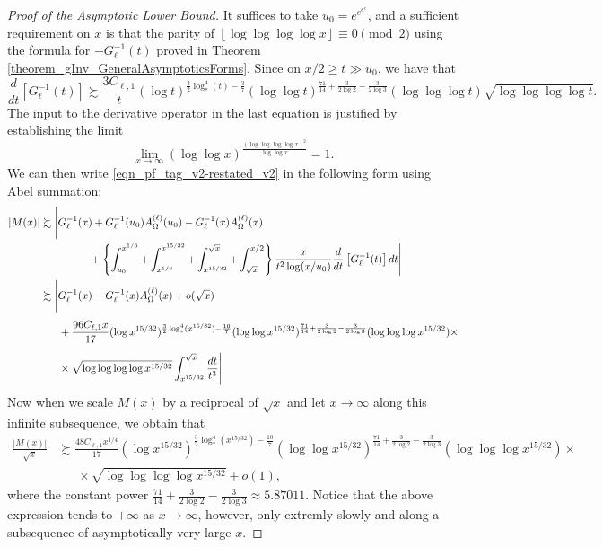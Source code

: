 \documentclass[11pt,reqno,a4letter]{article}
\numberwithin{figure}{section}
\numberwithin{table}{section}
\newcommand{\floor}[1]{\left\lfloor #1 \right\rfloor}
\theoremstyle{plain}
\numberwithin{theorem}{section}
\theoremstyle{definition}
\begin{document}
\begin{proof}[Proof of the Asymptotic Lower Bound] 
It suffices to take $u_0 = e^{e^{e^{e}}}$, 
and a sufficient requirement on $x$ is that the parity of 
$\floor{\log\log\log\log x} \equiv 0 \pmod{2}$ using the formula for 
$-G_{\ell}^{-1}(t)$ proved in Theorem \ref{theorem_gInv_GeneralAsymptoticsForms}. 
Since on $x/2 \geq t \gg u_0$, we have that 
\[
\frac{d}{dt}\left[G_{\ell}^{-1}(t)\right] \succsim 
     \frac{3 C_{\ell,1}}{t} (\log t)^{\frac{3}{2} \log_{\ast}^4(t) - \frac{3}{7}} 
     (\log\log t)^{\frac{71}{14} + \frac{3}{2 \log 2} - \frac{3}{2 \log 3}} 
     (\log\log\log t) \sqrt{\log\log\log\log t}. 
\]
The input to the derivative operator in the last equation is justified by establishing the limit 
\[
\lim_{x \rightarrow \infty} (\log\log x)^{\frac{(\log\log\log\log x)^2}{\log\log x}} = 1. 
\]
We can then write \eqref{eqn_pf_tag_v2-restated_v2} in the following form using Abel summation: 
\begin{align} 
\label{eqn_pf_tag_v2-restated_v3} 
|M(x)| & \succsim \Biggl\lvert G_{\ell}^{-1}(x) + G_{\ell}^{-1}(u_0) A_{\Omega}^{(\ell)}(u_0) - 
      G_{\ell}^{-1}(x) A_{\Omega}^{(\ell)}(x) \\ 
\notag 
      & \phantom{\succsim G_{ell}^{-1}(x)\ } + 
      \left\{\int_{u_0}^{x^{1/6}} + \int_{x^{1/6}}^{x^{15/32}} + \int_{x^{15/32}}^{\sqrt{x}} + 
      \int_{\sqrt{x}}^{x/2}\right\} 
      \frac{x}{t^2 \log(x/u_0)} \frac{d}{dt}\left[G_{\ell}^{-1}(t)\right] dt 
      \Biggr\rvert \\ 
\notag 
      & \succsim \Biggl\lvert G_{\ell}^{-1}(x) - 
      G_{\ell}^{-1}(x) A_{\Omega}^{(\ell)}(x) + o(\sqrt{x}) \\ 
\notag 
      & \phantom{\succsim \Biggl\lvert\ } + 
      \frac{96 C_{\ell,1} x}{17} (\log x^{15/32})^{\frac{3}{2} 
      \log_{\ast}^4(x^{15/32}) - \frac{10}{7}} 
      (\log\log x^{15/32})^{\frac{71}{14} + \frac{3}{2 \log 2} - \frac{3}{2 \log 3}} 
      (\log\log\log x^{15/32}) \times \\ 
\notag 
      & \phantom{\succsim \Biggl\lvert\ } \times 
      \sqrt{\log\log\log\log x^{15/32}} 
      \int_{x^{15/32}}^{\sqrt{x}} \frac{dt}{t^3}  
      \Biggr\rvert 
\end{align} 
Now when we scale $M(x)$ by a reciprocal of $\sqrt{x}$ and let 
$x \rightarrow \infty$ along this infinite subsequence, we obtain that 
\begin{align*} 
\frac{|M(x)|}{\sqrt{x}} & \succsim 
     \frac{48 C_{\ell,1} x^{1/4}}{17} (\log x^{15/32})^{\frac{3}{2} 
      \log_{\ast}^4(x^{15/32}) - \frac{10}{7}} 
      (\log\log x^{15/32})^{\frac{71}{14} + \frac{3}{2 \log 2} - \frac{3}{2 \log 3}} 
      (\log\log\log x^{15/32}) \times \\ 
      & \phantom{\succsim\ } \times 
      \sqrt{\log\log\log\log x^{15/32}}  + o(1), 
\end{align*} 
where the constant power 
$\frac{71}{14} + \frac{3}{2\log 2} - \frac{3}{2\log 3} \approx 5.87011$. 
Notice that the above expression tends to $+\infty$ as $x \rightarrow \infty$, however, only 
extremly slowly and along a subsequence of asymptotically very large $x$. 
\end{proof} 
\end{document}
